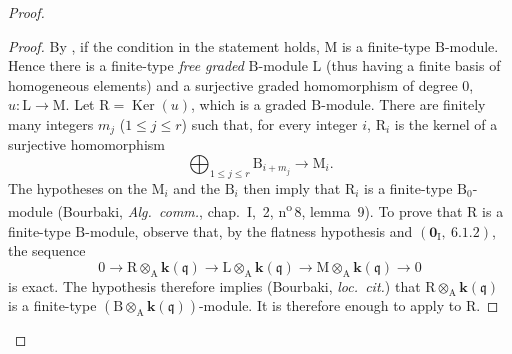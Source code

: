 \begin{proof}
\begin{proof}
By , if the condition in the statement holds,
$\mathrm{M}$ is a finite-type $\mathrm{B}$-module. Hence there is a
finite-type \emph{free graded} $\mathrm{B}$-module $\mathrm{L}$ (thus having
a finite basis of homogeneous elements) and a surjective graded
homomorphism of degree $0$, $u:\mathrm{L}\longrightarrow\mathrm{M}$.
Let $\mathrm{R}=\operatorname{Ker}(u)$, which is a graded
$\mathrm{B}$-module. There are finitely many integers $m_j$
($1\leqslant j\leqslant r$) such that, for every integer $i$,
$\mathrm{R}_i$ is the kernel of a surjective homomorphism
\[
 \bigoplus_{1\leqslant j\leqslant r}\mathrm{B}_{i+m_j}
 \longrightarrow \mathrm{M}_i.
\]
The hypotheses on the $\mathrm{M}_i$ and the $\mathrm{B}_i$ then
imply that $\mathrm{R}_i$ is a finite-type
$\mathrm{B}_0$-module (Bourbaki, \emph{Alg.\ comm.}, chap.~I,
\textsection\,2, n\textsuperscript{o}\,8, lemma~9). To prove that
$\mathrm{R}$ is a finite-type $\mathrm{B}$-module, observe that,
by the flatness hypothesis and $(\mathbf{0}_\mathrm{I},~6.1.2)$, the
sequence
\[
 0\longrightarrow
 \mathrm{R}\otimes_\mathrm{A}\boldsymbol{k}(\mathfrak{q})
 \longrightarrow
 \mathrm{L}\otimes_\mathrm{A}\boldsymbol{k}(\mathfrak{q})
 \longrightarrow
 \mathrm{M}\otimes_\mathrm{A}\boldsymbol{k}(\mathfrak{q})
 \longrightarrow 0
\]
is exact. The hypothesis therefore implies (Bourbaki,
\emph{loc.\ cit.}) that
$\mathrm{R}\otimes_\mathrm{A}\boldsymbol{k}(\mathfrak{q})$ is a
finite-type
$(\mathrm{B}\otimes_\mathrm{A}\boldsymbol{k}(\mathfrak{q}))$-module.
It is therefore enough to apply  to $\mathrm{R}$.
\end{proof}


\end{proof}
